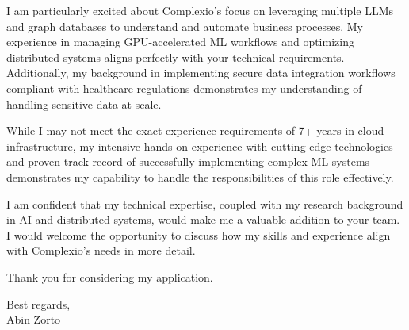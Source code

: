 \documentclass[10pt,a4paper]{article}
\begin{document}
I am particularly excited about Complexio's focus on leveraging multiple LLMs and graph databases to understand and automate business processes. My experience in managing GPU-accelerated ML workflows and optimizing distributed systems aligns perfectly with your technical requirements. Additionally, my background in implementing secure data integration workflows compliant with healthcare regulations demonstrates my understanding of handling sensitive data at scale.

While I may not meet the exact experience requirements of 7+ years in cloud infrastructure, my intensive hands-on experience with cutting-edge technologies and proven track record of successfully implementing complex ML systems demonstrates my capability to handle the responsibilities of this role effectively.

I am confident that my technical expertise, coupled with my research background in AI and distributed systems, would make me a valuable addition to your team. I would welcome the opportunity to discuss how my skills and experience align with Complexio's needs in more detail.

Thank you for considering my application.

Best regards,\\
Abin Zorto
\end{document}
